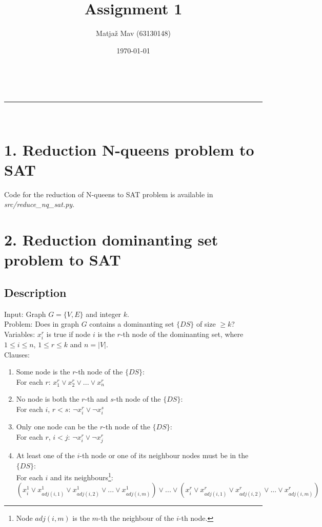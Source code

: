\documentclass[a4paper,11pt]{article}
\makeatletter
\newcommand{\linia}{\rule{\linewidth}{0.5pt}}
\theoremstyle{mytheor}
\renewcommand{\maketitle}{
\begin{center}
\vspace{2ex}
{\huge \textsc{\@title}}
\vspace{1ex}
\\
\linia\\
\@author \hfill \@date
\vspace{4ex}
\end{center}
}
\makeatother
\begin{document}
\title{Assignment 1}

\author{Matjaž Mav (63130148)}

\date{\today}

\maketitle

\section*{1. Reduction N-queens problem to SAT}
Code for the reduction of N-queens to SAT problem is available in \textit{src/reduce\_nq\_sat.py}.

\section*{2. Reduction dominanting set problem to SAT}

\subsection*{Description}

Input: Graph $G = \{V, E\}$ and integer $k$.\\
Problem: Does in graph $G$ contains a dominanting set $\{DS\}$ of size $\geq k$?\\
Variables: $x_i^r$ is true if node $i$ is the $r$-th node of the dominanting set, where $1 \leq i \leq n$, $1 \leq r \leq k$ and $n = |V|$.\\
Clauses:
\begin{enumerate}
  \item Some node is the $r$-th node of the $\{DS\}$:\\
        For each $r$: $x_1^r \lor x_2^r \lor ... \lor x_n^r$
  \item No node is both the $r$-th and $s$-th node of the $\{DS\}$:\\
        For each $i$, $r<s$: $\neg x_i^r \lor \neg x_i^s$
  \item Only one node can be the $r$-th node of the $\{DS\}$:\\
        For each $r$, $i<j$: $\neg x_i^r \lor \neg x_j^r$
  \item At least one of the $i$-th node or one of its neighbour nodes must be in the $\{DS\}$:\\
        For each $i$ and its neighbours\footnote{Node $adj(i, m)$ is the $m$-th the neighbour of the $i$-th node.}: $(x_i^1 \lor x_{adj(i, 1)}^1 \lor x_{adj(i, 2)}^1 \lor ... \lor x_{adj(i, m)}^1) \lor ... \lor (x_i^r \lor x_{adj(i, 1)}^r \lor x_{adj(i, 2)}^r \lor ... \lor x_{adj(i, m)}^r)$
\end{enumerate}
\end{document}
